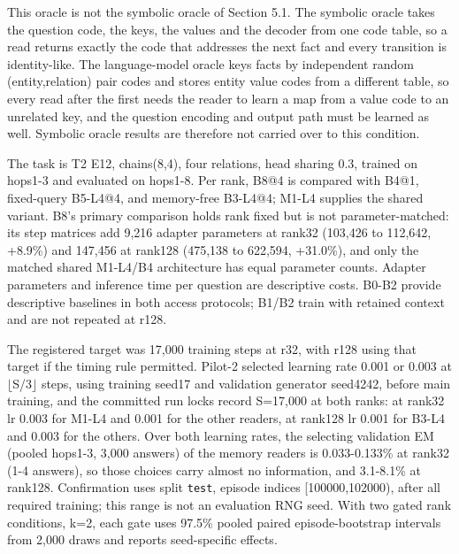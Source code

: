 This oracle is not the symbolic oracle of Section 5.1. The symbolic oracle takes the
question code, the keys, the values and the decoder from one code table, so a read returns
exactly the code that addresses the next fact and every transition is identity-like. The
language-model oracle keys facts by independent random (entity,relation) pair codes and
stores entity value codes from a different table, so every read after the first needs the
reader to learn a map from a value code to an unrelated key, and the question encoding and
output path must be learned as well. Symbolic oracle results are therefore not carried over
to this condition.  %

The task is T2 E12, chains(8,4), four relations, head sharing 0.3, trained on
hops1-3 and evaluated on hops1-8. Per rank, B8@4 is compared  %
with B4@1, fixed-query B5-L4@4, and memory-free B3-L4@4; M1-L4 supplies the shared
variant. B8’s primary comparison holds rank fixed but is not  %
parameter-matched: its step matrices add 9,216 adapter parameters at rank32 (103,426 to
112,642, +8.9\%) and 147,456 at rank128 (475,138 to 622,594, +31.0\%), and only the matched
shared M1-L4/\allowbreak{}B4 architecture has equal parameter counts. Adapter parameters and inference time per question  %
are descriptive costs. B0-B2 provide descriptive baselines in both  %
access protocols; B1/\allowbreak{}B2 train with retained context and are not repeated at r128.

The registered target was 17,000 training steps at r32, with r128 using that target if
the timing rule permitted. Pilot-2 selected learning rate 0.001 or 0.003 at  %
\ensuremath{\lfloor}S/\allowbreak{}3\ensuremath{\rfloor} steps, using training seed17 and validation generator seed4242, before main
training, and the committed run locks record S=17,000 at both ranks: at rank32 lr 0.003
for M1-L4 and 0.001 for the other readers, at rank128 lr 0.001 for B3-L4 and 0.003 for the
others. Over both learning rates, the selecting validation EM  %
(pooled hops1-3, 3,000 answers) of the memory readers is 0.033-0.133\% at rank32 (1-4
answers), so those choices carry almost no information, and 3.1-8.1\% at rank128.
 Confirmation uses split \texttt{test}, episode  %
indices [100000,102000), after all required training; this range is not an
evaluation RNG seed. With two gated rank conditions, k=2, each gate  %
uses 97.5\% pooled paired episode-bootstrap intervals from 2,000 draws and reports
seed-specific effects.  %

